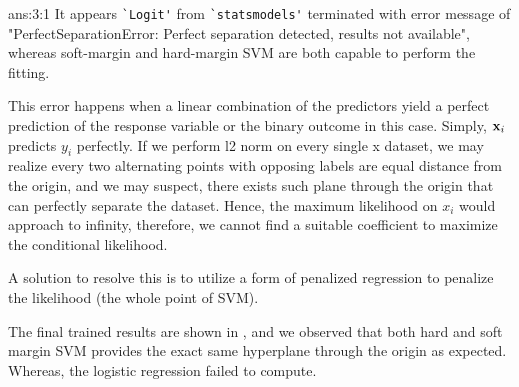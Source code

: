 \documentclass{tron}
\begin{document}
\newpage
\setcounter{answer}{0}
\begin{answer}{ans:3:1}
	It appears \verb|`Logit'| from \verb|`statsmodels'| terminated with error message of "PerfectSeparationError: Perfect separation detected, results not available", whereas soft-margin and hard-margin SVM are both capable to perform the fitting. 
	
	This error happens when a linear combination of the predictors yield a perfect prediction of the response variable or the binary outcome in this case. Simply, $\mathbf{x}_i$ predicts $y_i$ perfectly. If we perform l2 norm on every single x dataset, we may realize every two alternating points with opposing labels are equal distance from the origin, and we may suspect, there exists such plane through the origin that can perfectly separate the dataset. Hence, the maximum likelihood on $x_i$ would approach to infinity, therefore, we cannot find a suitable coefficient to maximize the conditional likelihood. 
	
	A solution to resolve this is to utilize a form of penalized regression to penalize the likelihood (the whole point of SVM).
	
	The final trained results are shown in , and we observed that both hard and soft margin SVM provides the exact same hyperplane through the origin as expected. Whereas, the logistic regression failed to compute.


\end{answer}
\end{document}
